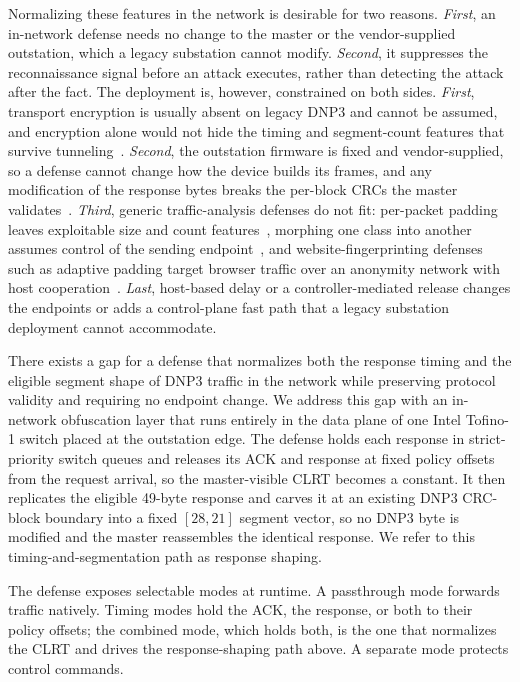 Normalizing these features in the network is desirable for two reasons. \emph{First}, an in-network
defense needs no change to the master or the vendor-supplied outstation, which a legacy substation
cannot modify. \emph{Second}, it suppresses the reconnaissance signal before an attack executes,
rather than detecting the attack after the fact. The deployment is, however, constrained on both
sides. \emph{First},
transport encryption is usually absent on legacy DNP3 and cannot be assumed, and encryption alone
would not hide the timing and segment-count features that survive tunneling~\cite{sirinam2018}.
\emph{Second}, the outstation firmware is fixed and vendor-supplied, so a defense cannot change how
the device builds its frames, and any modification of the response bytes breaks the per-block CRCs the
master validates~\cite{dnp3std}. \emph{Third}, generic traffic-analysis defenses do not fit: per-packet
padding leaves exploitable size and count features~\cite{dyer2012}, morphing one class into another
assumes control of the sending endpoint~\cite{wright2009}, and website-fingerprinting defenses such as
adaptive padding target browser traffic over an anonymity network with host cooperation~\cite{juarez2016}.
\emph{Last}, host-based delay or a controller-mediated release changes the endpoints or adds a
control-plane fast path that a legacy substation deployment cannot accommodate.

There exists a gap for a defense that normalizes both the response timing and the eligible segment
shape of DNP3 traffic in the network while preserving protocol validity and requiring
no endpoint change. We address this gap with an in-network obfuscation layer that runs entirely in the
data plane of one Intel Tofino-1 switch placed at the outstation edge. The defense holds each response
in strict-priority switch queues and releases its ACK and response at fixed policy offsets from the
request arrival, so the master-visible CLRT becomes a constant. It then replicates the eligible
49-byte response and carves it at an existing DNP3 CRC-block boundary into a fixed $[28,21]$ segment
vector, so no DNP3 byte is modified and the master reassembles the identical response. We refer to this
timing-and-segmentation path as response shaping.

The defense exposes selectable modes at runtime. A passthrough mode forwards traffic natively. Timing
modes hold the ACK, the response, or both to their policy offsets; the combined mode, which holds both,
is the one that normalizes the CLRT and drives the response-shaping path above. A separate mode
protects control commands.

